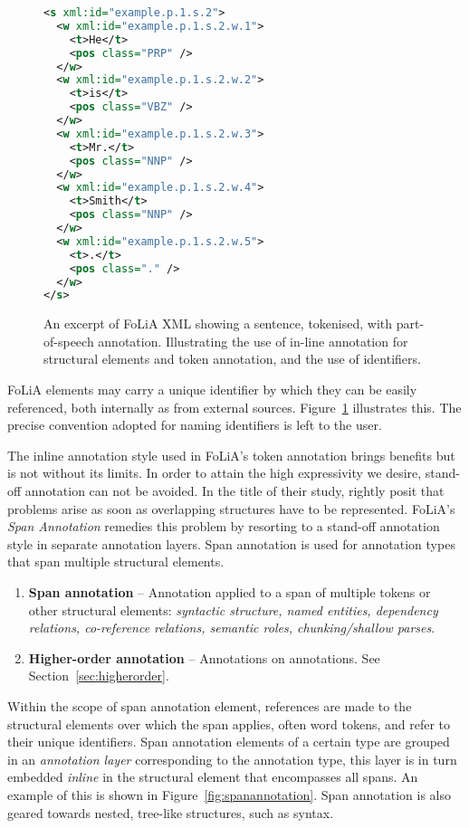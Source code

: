 \documentclass[a4paper,10pt,twoside]{article}
\begin{document}
\begin{figure}[tbh]
\label{fig:tokenannotation}
\begin{lstlisting}[language=xml]
<s xml:id="example.p.1.s.2">
  <w xml:id="example.p.1.s.2.w.1">
    <t>He</t>
    <pos class="PRP" />
  </w>
  <w xml:id="example.p.1.s.2.w.2">
    <t>is</t>
    <pos class="VBZ" />
  </w>
  <w xml:id="example.p.1.s.2.w.3">
    <t>Mr.</t>
    <pos class="NNP" />
  </w>
  <w xml:id="example.p.1.s.2.w.4">
    <t>Smith</t>
    <pos class="NNP" />
  </w>
  <w xml:id="example.p.1.s.2.w.5">
    <t>.</t>
    <pos class="." />
  </w>
</s>
\end{lstlisting}
\caption{An excerpt of FoLiA XML showing a sentence, tokenised, with
part-of-speech annotation. Illustrating the use of in-line annotation for
structural elements and token annotation, and the use of identifiers.}
\end{figure}

FoLiA elements may carry a unique identifier by which they can be easily
referenced, both internally as from external sources. Figure~\ref{fig:tokenannotation} illustrates this. The precise convention adopted for naming identifiers is left to the user.

The inline annotation style used in FoLiA's token annotation brings benefits
but is not without its limits. In order to attain the high expressivity we
desire, stand-off annotation can not be avoided. In the title of their study,
\cite{OHCO2} rightly posit that problems arise as soon as overlapping
structures have to be represented. FoLiA's \emph{Span Annotation} remedies
this problem by resorting to a stand-off annotation style in separate
annotation layers. Span annotation is used for annotation types that span
multiple structural elements.

\begin{enumerate}
\setcounter{enumi}{\theenumTemptwo}
\item \textbf{Span annotation} -- 
Annotation applied to a span of multiple tokens or other structural elements:
\emph{syntactic structure, named entities, dependency relations, co-reference
relations, semantic roles, chunking/shallow parses}.
\item \textbf{Higher-order annotation} -- Annotations on annotations. See Section~\ref{sec:higherorder}.
\end{enumerate}


Within the scope of span annotation element, references are made to the
structural elements over which the span applies, often word tokens,
and refer to their unique identifiers. Span annotation elements of a certain
type are grouped in an \emph{annotation layer} corresponding to the annotation
type, this layer is in turn embedded \emph{inline} in the structural element
that encompasses all spans. An example of this is shown in
Figure~\ref{fig:spanannotation}. Span annotation is also geared towards nested,
tree-like structures, such as syntax.
\end{document}
